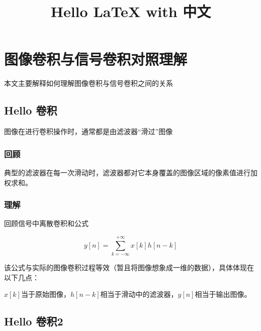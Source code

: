 \documentclass{article}
\title{Hello LaTeX with 中文}
\begin{document}
    \maketitle
    \section{图像卷积与信号卷积对照理解}
    本文主要解释如何理解图像卷积与信号卷积之间的关系
      \subsection{Hello 卷积}
      图像在进行{卷积}操作时，通常都是由滤波器“滑过”图像
      
      \subsubsection{回顾}
      典型的滤波器在每一次滑动时，滤波器都对它本身覆盖的图像区域的像素值进行加权求和。
    
      \subsubsection{理解}
      回顾信号中离散卷积和公式
    
      $$y\left[ n \right] = \sum\limits_{k =  - \infty }^{ + \infty } {x\left[ k \right]h\left[ {n - k} \right]}$$
    
      该公式与实际的图像卷积过程等效（暂且将图像想象成一维的数据），具体体现在以下几点：
    
      ${x\left[ k \right]}$当于原始图像，${h\left[ {n - k} \right]}$相当于滑动中的滤波器，$y\left[ n \right]$相当于输出图像。
    
    \subsection{Hello 卷积2}
  
    
\end{document}
